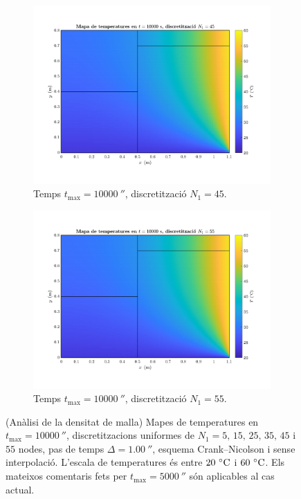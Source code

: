 \begin{figure}[ht]
	\begin{subfigure}{.5\textwidth}
		\centering
		\includegraphics[width=.95\linewidth]{imagenes/04_analisi_influencia_dades_numeriques/malla/malla_11.pdf}
		\vspace{-15pt}
		\caption{Temps $t_\text{max} = 10000 \ \second$, discretització $N_1 = 45$.}
		\label{fig:malla_11}
	\end{subfigure}%
	\begin{subfigure}{.5\textwidth}
		\centering
		\includegraphics[width=.95\linewidth]{imagenes/04_analisi_influencia_dades_numeriques/malla/malla_12.pdf}
		\vspace{-15pt}
		\caption{Temps $t_\text{max} = 10000 \ \second$, discretització $N_1 = 55$.}
		\label{fig:malla_12}
	\end{subfigure}
	\caption{(Anàlisi de la densitat de malla) Mapes de temperatures en $t_\text{max} = 10000 \ \second$, discretitzacions uniformes de $N_1 = 5, \, 15, \, 25, \, 35, \, 45$ i $55$ nodes, pas de temps $\Delta = 1.00 \ \second$, esquema Crank--Nicolson i sense interpolació. L'escala de temperatures és entre $20 \ \celsius$ i $60 \ \celsius$. Els mateixos comentaris fets per $t_\text{max} = 5000 \ \second$ són aplicables al cas actual.}
	\label{fig:malla_10000}
\end{figure} 

